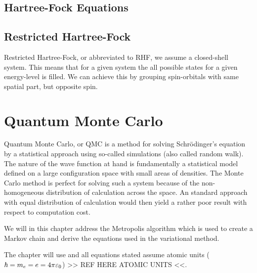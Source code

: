     \subsection{Hartree-Fock Equations}

    \subsection{Restricted Hartree-Fock}
        Restricted Hartree-Fock, or abbreviated to RHF, we assume a
        closed-shell system. This means that for a given system the all
        possible states for a given energy-level is filled. We can achieve this
        by grouping spin-orbitals with same spatial part, but opposite spin.

\section{Quantum Monte Carlo\label{sec:QMC}}
    Quantum Monte Carlo, or QMC is a method for solving Schrödinger's equation
    by a statistical approach using so-called  simulations
    (also called random walk). The nature of the wave function at hand is
    fundamentally a statistical model defined on a large configuration space
    with small areas of densities. The Monte Carlo method is perfect for
    solving such a system because of the non-homogeneous distribution of
    calculation across the space. An standard approach with equal distribution
    of calculation would then yield a rather poor result with respect to
    computation cost.

    We will in this chapter address the Metropolis algorithm which is used to
    create a Markov chain and derive the equations used in the variational
    method.

    The chapter will use  \cite{GriffQuan} and all
    equations stated assume atomic units ($\hbar=m_e=e=4\pi\varepsilon_0$) >> REF
    HERE ATOMIC UNITS <<.

